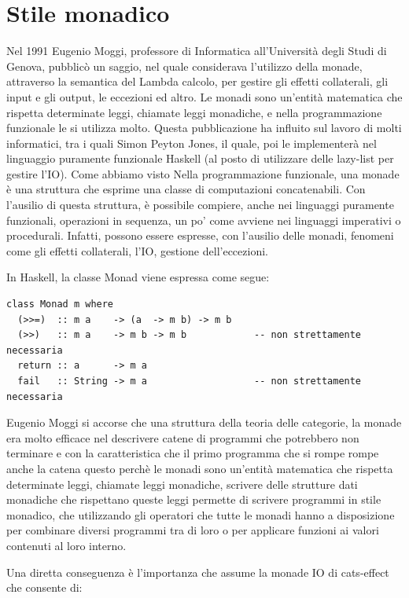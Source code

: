 \section{Stile monadico}
Nel 1991 Eugenio Moggi, professore di Informatica all'Università degli Studi di Genova, pubblicò un saggio, nel quale considerava l'utilizzo della monade, attraverso la semantica del Lambda calcolo, per gestire gli effetti collaterali, gli input e gli output, le eccezioni ed altro. Le monadi sono un'entità matematica che rispetta determinate leggi, chiamate leggi monadiche, e nella programmazione funzionale le si utilizza molto. Questa pubblicazione ha influito sul lavoro di molti informatici, tra i quali Simon Peyton Jones, il quale, poi le implementerà nel linguaggio puramente funzionale Haskell (al posto di utilizzare delle lazy-list per gestire l'IO). Come abbiamo visto Nella programmazione funzionale, una monade è una struttura che esprime una classe di computazioni concatenabili. Con l'ausilio di questa struttura, è possibile compiere, anche nei linguaggi puramente funzionali, operazioni in sequenza, un po' come avviene nei linguaggi imperativi o procedurali. Infatti, possono essere espresse, con l'ausilio delle monadi, fenomeni come gli effetti collaterali, l'IO, gestione dell'eccezioni.

\noindent In Haskell, la classe Monad viene espressa come segue:
\begin{verbatim}
class Monad m where
  (>>=)  :: m a    -> (a  -> m b) -> m b
  (>>)   :: m a    -> m b -> m b            -- non strettamente necessaria
  return :: a      -> m a
  fail   :: String -> m a                   -- non strettamente necessaria
\end{verbatim}

Eugenio Moggi  si accorse che una struttura della teoria delle categorie, la monade era molto efficace nel descrivere catene di programmi che potrebbero non terminare e con la caratteristica che il primo programma che si rompe rompe anche la catena questo perchè le monadi sono un'entità matematica che rispetta determinate leggi, chiamate leggi monadiche, scrivere delle strutture dati monadiche che rispettano queste leggi permette di scrivere programmi in stile monadico, che utilizzando gli operatori che tutte le monadi hanno a disposizione per combinare diversi programmi tra di loro o per applicare funzioni ai valori contenuti al loro interno. 

Una diretta conseguenza è l'importanza che assume la monade IO di cats-effect che consente di: 


